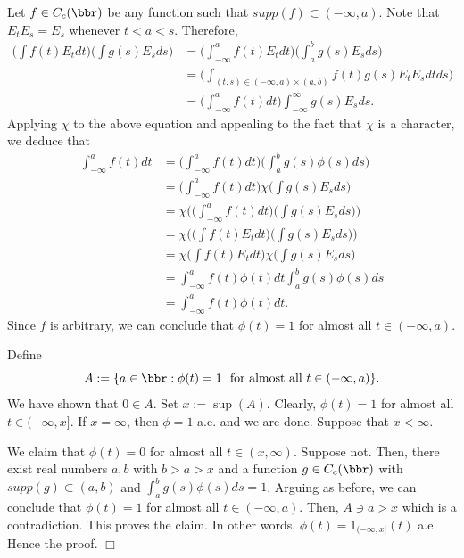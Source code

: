 Let $f \in C_{c}(\bbr)$ be any function such that $supp(f) \subset (-\infty,a)$. 
Note that $E_tE_s=E_s$ whenever $t<a<s$. Therefore, 
\begin{align*}
\Big(\int f(t)E_tdt\Big)\Big(\int g(s)E_sds\Big)&=\Big(\int_{-\infty}^{a}f(t)E_tdt\Big)\Big(\int_{a}^{b}g(s)E_sds\Big)\\
&=\Big(\int_{(t,s) \in (-\infty,a) \times (a,b)} f(t)g(s)E_tE_sdtds\Big)\\
&=\Big(\int_{-\infty}^{a}f(t)dt\Big)\int_{-\infty}^{\infty}g(s)E_sds.
\end{align*}
Applying $\chi$ to the above equation and appealing to the fact that $\chi$ is a character, we deduce that 
\begin{align*}
\int_{-\infty}^{a}f(t)dt& = \Big(\int_{-\infty}^{a}f(t)dt\Big)\Big(\int_{a}^{b} g(s)\phi(s)ds\Big)\\
&=\Big(\int_{-\infty}^{a}f(t)dt\Big)\chi\Big(\int g(s)E_s ds\Big)\\
&=\chi\Big(\Big(\int_{-\infty}^{a}f(t)dt\Big)\Big(\int g(s)E_sds\Big)\Big) \\
&=\chi\Big(\Big(\int f(t)E_tdt \Big)\Big(\int g(s)E_sds\Big)\Big)\\
&=\chi\Big(\int f(t)E_tdt \Big)\chi\Big(\int g(s)E_sds\Big)\\
&=\int_{-\infty}^{a}f(t)\phi(t)dt \int_{a}^{b} g(s)\phi(s)ds \\
&=\int_{-\infty}^{a}f(t)\phi(t)dt. 
\end{align*}
Since $f$ is arbitrary, we can conclude that $\phi(t)=1$ for almost all $t \in (-\infty,a)$.

Define \[A:=\{a \in \bbr: \phi(t)=1 \textrm{~~for almost all $t \in (-\infty,a)$}\}.\] We have shown that $0 \in A$. Set $x:=\sup(A)$. Clearly, $\phi(t)=1$ for almost all $t \in (-\infty,x]$.  If $x=\infty$, then $\phi=1$ a.e. and we are done. 
Suppose that $x<\infty$. 

We claim that $\phi(t)=0$ for almost all $t \in (x,\infty)$. Suppose not. Then, there exist real numbers $a,b$ with $b>a>x$ and a function $g \in C_{c}(\bbr)$ with $supp(g) \subset (a,b)$ and $\int_{a}^{b} g(s)\phi(s)ds=1$. Arguing as before, we 
can conclude that $\phi(t)=1$ for almost all $t \in (-\infty,a)$. Then, $A \ni a >x$ which is a contradiction. This proves the claim. In other words, $\phi(t)=1_{(-\infty,x]}(t)$ a.e. Hence the proof. \hfill $\Box$

